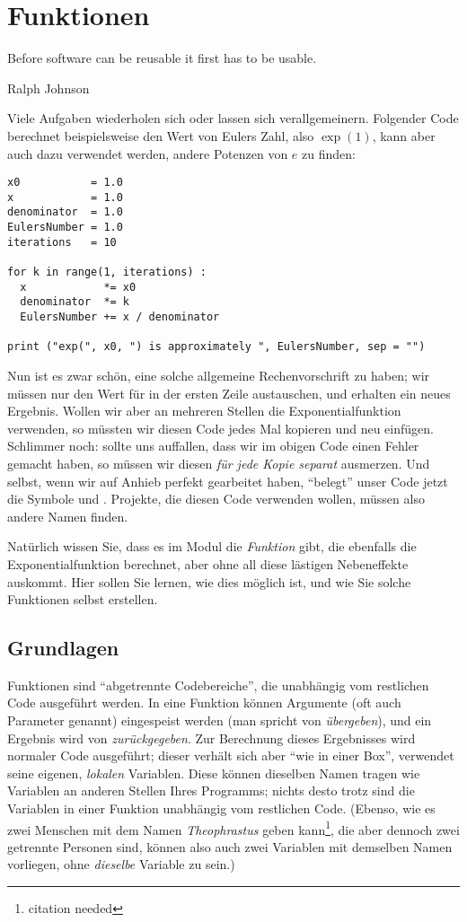 \chapter{Funktionen}
\label{chp:Funcs}
\epigraph{
	Before software can be reusable it first has to be usable.
}{Ralph Johnson}

Viele Aufgaben wiederholen sich oder lassen sich verallgemeinern. Folgender Code berechnet beispielsweise den Wert von Eulers Zahl, also $\exp(1)$, kann aber auch dazu verwendet werden, andere Potenzen von $e$ zu finden:

\begin{codebox}
\begin{verbatim}
x0           = 1.0
x            = 1.0
denominator  = 1.0
EulersNumber = 1.0
iterations   = 10

for k in range(1, iterations) :
  x            *= x0
  denominator  *= k
  EulersNumber += x / denominator

print ("exp(", x0, ") is approximately ", EulersNumber, sep = "")
\end{verbatim}
\end{codebox}

Nun ist es zwar schön, eine solche allgemeine Rechenvorschrift zu haben; wir müssen nur den Wert für  in der ersten Zeile austauschen, und erhalten ein neues Ergebnis. Wollen wir aber an mehreren Stellen die Exponentialfunktion verwenden, so müssten wir diesen Code jedes Mal kopieren und neu einfügen. Schlimmer noch: sollte uns auffallen, dass wir im obigen Code einen Fehler gemacht haben, so müssen wir diesen \emph{für jede Kopie separat} ausmerzen. Und selbst, wenn wir auf Anhieb perfekt gearbeitet haben, \enquote{belegt} unser Code jetzt \ua die Symbole  und . Projekte, die diesen Code verwenden wollen, müssen also andere Namen finden.

Natürlich wissen Sie, dass es im Modul  die \emph{Funktion}  gibt, die ebenfalls die Exponentialfunktion berechnet, aber ohne all diese lästigen Nebeneffekte auskommt. Hier sollen Sie lernen, wie dies möglich ist, und wie Sie solche Funktionen selbst erstellen.

\section{Grundlagen}
Funktionen sind \enquote{abgetrennte Codebereiche}, die unabhängig vom restlichen Code ausgeführt werden. In eine Funktion können Argumente (oft auch Parameter genannt) eingespeist werden (man spricht von \emph{übergeben}), und ein Ergebnis wird von  \emph{zurückgegeben}. Zur Berechnung dieses Ergebnisses wird normaler Code ausgeführt; dieser verhält sich aber \enquote{wie in einer Box}, \ie verwendet seine eigenen, \emph{lokalen} Variablen. Diese können dieselben Namen tragen wie Variablen an anderen Stellen Ihres Programms; nichts desto trotz sind die Variablen in einer Funktion unabhängig vom restlichen Code. (Ebenso, wie es zwei Menschen mit dem Namen \emph{Theophrastus} geben kann\footnote{citation needed}, die aber dennoch zwei getrennte Personen sind, können also auch zwei Variablen mit demselben Namen vorliegen, ohne \emph{dieselbe} Variable zu sein.)

